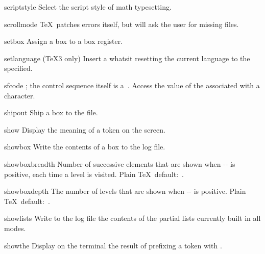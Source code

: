 \item scriptstyle
      Select the script style of math typesetting.

\item scrollmode
      \TeX\ patches errors itself, but will ask the user for missing files.

\item setbox
      Assign a box to a box register.

\item setlanguage
      (\TeX3 only) 
      Insert a whatsit resetting the current language
      to the  specified.

\item sfcode
      ; the control sequence itself
      is a~.
      Access the value of the 
      associated with a character.

\item shipout
      Ship a box to the  file.

\item show
      Display the meaning of a token on the screen.

\item showbox
      Write the contents of a box to the log file.

\item showboxbreadth
      Number of successive elements that are shown when 
      \ver-\tracingoutput- is positive, each time a level is visited.
      Plain \TeX\ default:~.

\item showboxdepth 
      The number of levels that are shown when 
      \ver-\tracingoutput- is positive.
      Plain \TeX\ default:~.

\item showlists
      Write to the log file the contents of the partial lists 
      currently built in all modes.

\item showthe
      Display on the terminal the result 
      of prefixing a token with .

